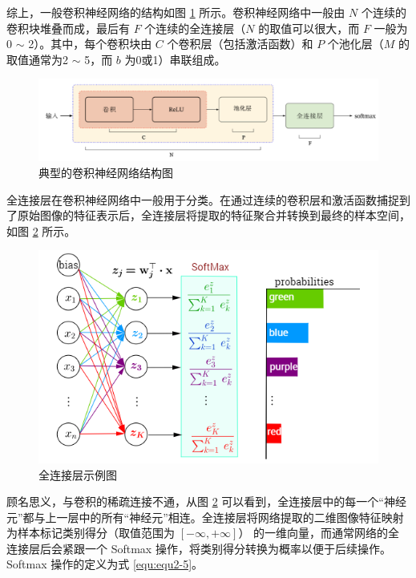 综上，一般卷积神经网络的结构如图 \ref{fig:fig2-6} 所示。卷积神经网络中一般由 $N$ 个连续的卷积块堆叠而成，最后有 $F$ 个连续的全连接层（$N$ 的取值可以很大，而 $F$ 一般为0 $\sim$ 2）。其中，每个卷积块由 $C$ 个卷积层（包括激活函数）和 $P$ 个池化层（$M$ 的取值通常为2 $\sim$ 5，而 $b$ 为0或1）串联组成。

\begin{figure}[!htbp]
	\centering
	\includegraphics{figures/7.png}
	\caption{典型的卷积神经网络结构图}
	\label{fig:fig2-6}
\end{figure}

\newpage
全连接层在卷积神经网络中一般用于分类。在通过连续的卷积层和激活函数捕捉到了原始图像的特征表示后，全连接层将提取的特征聚合并转换到最终的样本空间，如图 \ref{fig:fig2-7} 所示。

\begin{figure}[!htbp]
	\centering
	\includegraphics[scale=0.55]{figures/8.png}
	\caption{全连接层示例图}
	\label{fig:fig2-7}
\end{figure}

顾名思义，与卷积的稀疏连接不通，从图 \ref{fig:fig2-7} 可以看到，全连接层中的每一个“神经元”都与上一层中的所有“神经元”相连。全连接层将网络提取的二维图像特征映射为样本标记类别得分（取值范围为 $\left[-\infty,+\infty\right]$） 的一维向量，而通常网络的全连接层后会紧跟一个 Softmax 操作，将类别得分转换为概率以便于后续操作。 Softmax 操作的定义为式 \ref{equ:equ2-5}。

